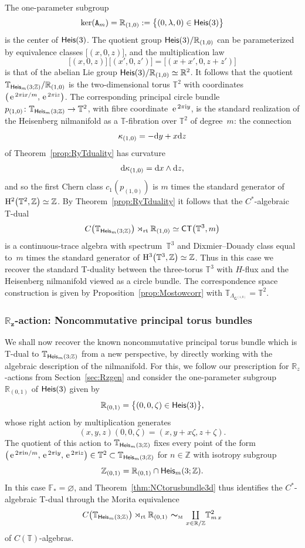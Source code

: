 \documentclass[pdftex]{sigma}
\numberwithin{equation}{section}
\newcommand{\C}{\complex}
\newcommand{\Z}{\zed}
\newcommand{\F}{\mathbb{F}}
\newcommand{\mbf}[1]{{\boldsymbol {#1} }}
\def\ii{{{\rm i}}}
\def\dd{{\rm d}}
\def\T{{\sf T}}
\def\C{{\sf C}}
\newcommand{\sfG}{\mathsf{G}}
\newcommand{\Heis}{{\sf Heis}}
\newcommand{\rt}{{\rm rt}}
\newcommand{\mcoprod}{\mbox{$\coprod\limits_{x\in\R/\Z}$}}
\newcommand{\R}{\real}
\newcommand{\complex}{{\mathbb C}} %
\newcommand{\zed}{{\mathbb Z}} %
\newcommand{\real}{{\mathbb R}} %
\newcommand{\torus}{{\mathbb T}} %
\def\e{{\,\rm e}\,}
\begin{document}
The one-parameter subgroup
\[
\ker({\tt A}_m) = \real_{(1,0)}:=\big\{(0,\lambda,0) \in \Heis(3) \big\}
\]
is the center of $\Heis(3)$. The quotient group $\Heis(3)/\R_{(1,0)}$ can be parameterized by equivalence
classes $\big[(x,0,z)\big]$, and the
multiplication law
\[
\big[(x,0,z)\big]\,\big[(x',0,z')\big] = \big[(x+x',0,z+z')\big]
\]
is that of the abelian Lie group $\Heis(3)/\R_{(1,0)}\simeq\R^2$. It follows that the quotient
$\torus_{\Heis_m(3;\Z)}/\real_{(1,0)}$ is the two-dimensional torus
$\torus^2$ with coordinates $\big(\e^{2\pi\ii x/m},\e^{2\pi\ii z}\big)$. The corresponding principal circle bundle
$p_{(1,0)}\colon \torus_{\Heis_m(3;\Z)}\to{ \torus^2}$, with fibre coordinate $\e^{2\pi\ii y}$, is the standard realization of
the Heisenberg nilmanifold as a $\torus$-fibration over $\torus^2$ of
degree~$m$: the connection
\[
\kappa_{(1,0)} = -\dd y + x \dd z
\]
of Theorem~\ref{prop:RyTduality} has
curvature
\begin{gather*}
\dd\kappa_{(1,0)} = \dd x\wedge \dd z ,%
\end{gather*}
and so the first Chern class $c_1(p_{(1,0)})$ is $m$ times the standard generator of
${\rm H}^2\big(\torus^2,\Z\big)\simeq\Z$.
By Theorem~\ref{prop:RyTduality} it follows that the $C^*$-algebraic
T-dual
\[
C\big(\torus_{\Heis_m(3;\Z)}\big) \rtimes_\rt \real_{(1,0)} \simeq \C\T\big(\torus^3,m\big)
\]
is a continuous-trace algebra with spectrum~$\torus^3$ and
Dixmier--Douady class equal to~$m$ times the standard generator of ${\rm
 H}^3\big(\torus^3,\Z\big)\simeq\Z$. Thus in this case we recover the
standard T-duality between the three-torus $\torus^3$ with $H$-flux
and the Heisenberg nilmanifold viewed as a circle bundle.
The correspondence space construction is given by
Proposition~\ref{prop:Mostowcorr} with
$\torus_{\Lambda_{\sfG^{(1,0)}}}=\torus^2$.

\subsubsection*{$\boldsymbol{\real_z}$-action: Noncommutative principal torus bundles}\label{sec:nilNCtorus}

We shall now recover the known noncommutative principal torus bundle
which is T-dual to $\torus_{\Heis_m(3;\Z)}$ from a new
perspective, by directly working with the algebraic description of the
nilmanifold. For this, we follow our prescription for $\R_z$-actions
from Section~\ref{sec:Rzgen} and consider the one-parameter subgroup
$\real_{(0,1)}$ of $\Heis(3)$ given by
\[
\real_{(0,1)} = \big\{(0,0,\zeta)\in\Heis(3) \big\} ,
\]
whose right action by multiplication generates
\[
(x,y,z) (0,0,\zeta) = (x,y+x \zeta,z+\zeta) .
\]
The quotient of this action to $\torus_{\Heis_m(3;\Z)}$ fixes
every point of the form $\big(\e^{2\pi\ii n/m},\e^{2\pi\ii
 y},\e^{2\pi\ii z}\big)\in\torus^2\subset \torus_{\Heis_m(3;\Z)}$ for
$n\in\Z$ with isotropy
subgroup
\[
\Z_{(0,1)} = \real_{(0,1)}\cap\Heis_m(3;\Z) .
\]
In this case $\F_*=\varnothing$, and Theorem~\ref{thm:NCtorusbundle3d} thus identifies the $C^*$-algebraic
T-dual through the Morita equivalence{\samepage
\[
C\big(\torus_{\Heis_m(3;\Z)}\big)\rtimes_\rt\real_{(0,1)} \ \mbf\sim_{\text{\tiny M}} \
\mcoprod \torus_{m\,x}^2
\]
of {$C(\torus)$-algebras}.}
\end{document}
